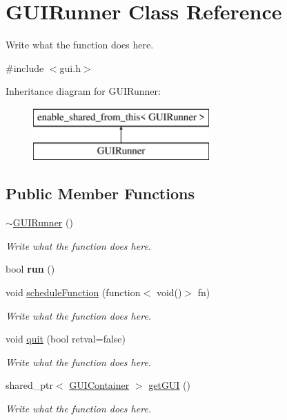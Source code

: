 \hypertarget{classGUIRunner}{\section{G\+U\+I\+Runner Class Reference}
\label{classGUIRunner}
}


Write what the function does here.  




{\ttfamily \#include $<$gui.\+h$>$}

Inheritance diagram for G\+U\+I\+Runner\+:\begin{figure}[H]
\begin{center}
\leavevmode
\includegraphics[height=2.000000cm]{classGUIRunner}
\end{center}
\end{figure}
\subsection*{Public Member Functions}
\begin{DoxyCompactItemize}
\item 
\hyperlink{classGUIRunner_aede15735ddb1dfdde334cfa6a4263c8d}{$\sim$\+G\+U\+I\+Runner} ()
\begin{DoxyCompactList}\small\item\em Write what the function does here. \end{DoxyCompactList}\item 
\hypertarget{classGUIRunner_aa573be0a5f5473f5a7fe492eb2d94894}{bool {\bfseries run} ()}\label{classGUIRunner_aa573be0a5f5473f5a7fe492eb2d94894}

\item 
void \hyperlink{classGUIRunner_a71350d287889af5d9e588af1361390d0}{schedule\+Function} (function$<$ void()$>$ fn)
\begin{DoxyCompactList}\small\item\em Write what the function does here. \end{DoxyCompactList}\item 
void \hyperlink{classGUIRunner_a516b306d0c8ba1ba979db12947ea5541}{quit} (bool retval=false)
\begin{DoxyCompactList}\small\item\em Write what the function does here. \end{DoxyCompactList}\item 
shared\+\_\+ptr$<$ \hyperlink{classGUIContainer}{G\+U\+I\+Container} $>$ \hyperlink{classGUIRunner_a9c09adda078b10a901dacb17fae7d888}{get\+G\+U\+I} ()
\begin{DoxyCompactList}\small\item\em Write what the function does here. \end{DoxyCompactList}\end{DoxyCompactItemize}

